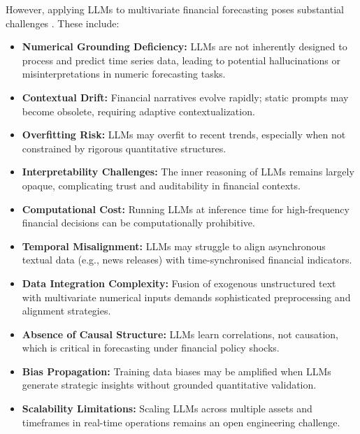 \documentclass[conference]{IEEEtran}
\begin{document}
However, applying LLMs to multivariate financial forecasting poses substantial challenges \cite{zhao2024augmentingllm, smith2023financialcognitivellm, garcia2023sentimentllm, liu2023causalfinance, park2023reinforcementagent, kim2024metafinagent, lee2023textnumericfusion, kang2022volatilitychangepoints, allen2023stressforecast, brown2024adaptivehybrid}. These include:
\begin{itemize}
    \item \textbf{Numerical Grounding Deficiency:} LLMs are not inherently designed to process and predict time series data, leading to potential hallucinations or misinterpretations in numeric forecasting tasks.
    \item \textbf{Contextual Drift:} Financial narratives evolve rapidly; static prompts may become obsolete, requiring adaptive contextualization.
    \item \textbf{Overfitting Risk:} LLMs may overfit to recent trends, especially when not constrained by rigorous quantitative structures.
    \item \textbf{Interpretability Challenges:} The inner reasoning of LLMs remains largely opaque, complicating trust and auditability in financial contexts.
    \item \textbf{Computational Cost:} Running LLMs at inference time for high-frequency financial decisions can be computationally prohibitive.
    \item \textbf{Temporal Misalignment:} LLMs may struggle to align asynchronous textual data (e.g., news releases) with time-synchronised financial indicators.
    \item \textbf{Data Integration Complexity:} Fusion of exogenous unstructured text with multivariate numerical inputs demands sophisticated preprocessing and alignment strategies.
    \item \textbf{Absence of Causal Structure:} LLMs learn correlations, not causation, which is critical in forecasting under financial policy shocks.
    \item \textbf{Bias Propagation:} Training data biases may be amplified when LLMs generate strategic insights without grounded quantitative validation.
    \item \textbf{Scalability Limitations:} Scaling LLMs across multiple assets and timeframes in real-time operations remains an open engineering challenge.
\end{itemize}
\end{document}
